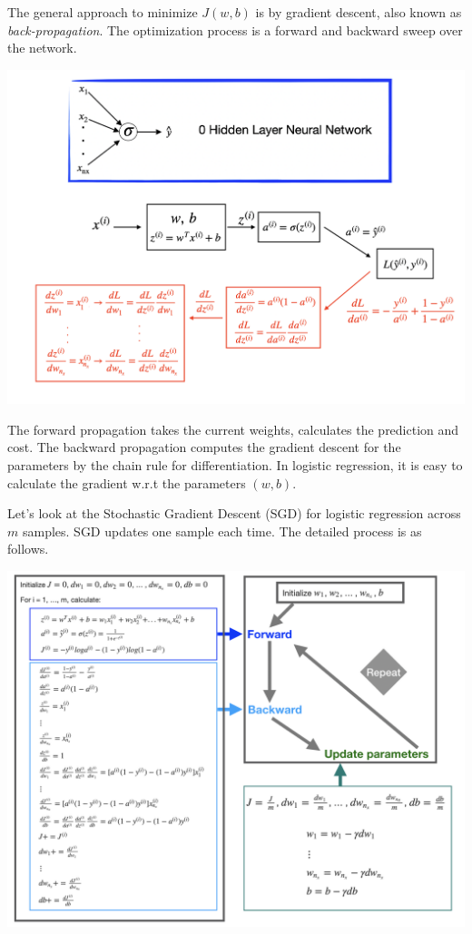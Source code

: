 \documentclass[
  12pt,
]{krantz}
\begin{document}
The general approach to minimize \(J(w,b)\) is by gradient descent, also known as \emph{back-propagation}. The optimization process is a forward and backward sweep over the network.

\includegraphics[width=1\textwidth,height=\textheight]{images/dnn0_fb3.png}

The forward propagation takes the current weights, calculates the prediction and cost. The backward propagation computes the gradient descent for the parameters by the chain rule for differentiation. In logistic regression, it is easy to calculate the gradient w.r.t the parameters \((w, b)\).

Let's look at the Stochastic Gradient Descent (SGD) for logistic regression across \(m\) samples. SGD updates one sample each time. The detailed process is as follows.

\includegraphics[width=1\textwidth,height=\textheight]{images/GradientDescent.png}
\end{document}
